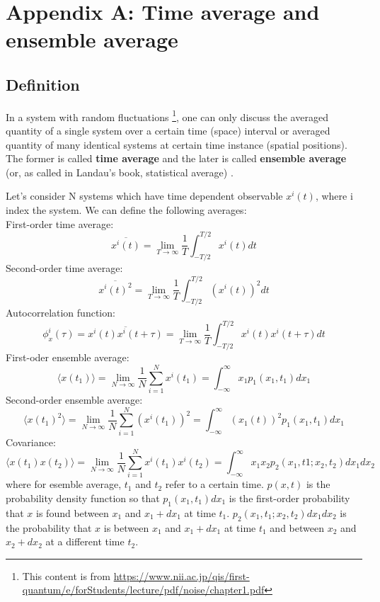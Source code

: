 \documentclass{article}
\begin{document}
\pagebreak
\section*{Appendix A: Time average and ensemble average}
\subsection*{Definition}
In a system with random fluctuations
\footnote{This content is from \url{https://www.nii.ac.jp/qis/first-quantum/e/forStudents/lecture/pdf/noise/chapter1.pdf}}, 
one can only discuss the averaged quantity of a single system over a certain
time (space) interval or averaged quantity of many identical systems at certain 
time instance (spatial positions). The former is called \textbf{time average} and 
the later is called \textbf{ensemble average} (or, as called in Landau's book, statistical average) . 

Let's consider N systems which have time dependent observable $x^{i}(t)$, where
i index the system. We can define the following averages: \\
First-order time average: 
\begin{equation}
    \overline{x^i(t)} = \lim_{T\to\infty} \frac{1}{T} \int_{-T/2}^{T/2} x^i(t) dt
\end{equation}
Second-order time average:
\begin{equation}
    \overline{x^i(t)^2} = \lim_{T\to\infty} \frac{1}{T} \int_{-T/2}^{T/2} \left( x^i(t) \right)^2 dt
\end{equation}
Autocorrelation function:
\begin{equation}
    \phi_x^i(\tau) = \overline{x^i(t)x^i(t+\tau)} 
    = \lim_{T\to\infty} \frac{1}{T} \int_{-T/2}^{T/2} x^i(t) x^i(t+\tau) dt
\end{equation}
First-oder ensemble average:
\begin{equation}
    \langle x(t_1) \rangle = \lim_{N\to\infty} \frac{1}{N} \sum_{i=1}^{N} x^i(t_1) 
        = \int_{-\infty}^{\infty} x_1 p_1(x_1, t_1) dx_1
\end{equation}
Second-order ensemble average:
\begin{equation}
    \langle x(t_1)^2 \rangle = \lim_{N\to\infty} \frac{1}{N} \sum_{i=1}^{N} \left( x^i(t_1) \right)^2  
        = \int_{-\infty}^{\infty} \left( x_1(t) \right)^2  p_1(x_1, t_1) dx_1
\end{equation}
Covariance:
\begin{equation}
    \langle x(t_1)x(t_2) \rangle = \lim_{N\to\infty} \frac{1}{N} \sum_{i=1}^{N}  x^i(t_1) x^i(t_2)
        = \int_{-\infty}^{\infty} x_1 x_2 p_2(x_1, t1; x_2, t_2) dx_1 dx_2
\end{equation}
where for esemble average, $t_1$ and $t_2$ refer to a certain time. $p(x,t)$ is the 
probability density function so that $p_1(x_1,t_1)dx_1$ is the 
first-order probability that $x$ is found between $x_1$ and $x_1 + dx_1$ at time $t_1$. 
$p_2(x_1, t_1; x_2, t_2)dx_1 dx_2$ is the probability that $x$ is between $x_1$ and $x_1 + dx_1$
at time $t_1$ and between $x_2$ and $x_2 + dx_2$ at a different time $t_2$.
\end{document}
